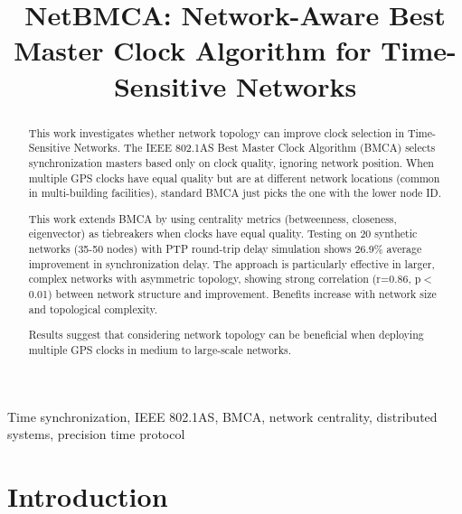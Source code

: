 \documentclass[conference]{IEEEtran}
\begin{document}
\title{NetBMCA: Network-Aware Best Master Clock Algorithm for Time-Sensitive Networks\\}

\author{
}


\maketitle

\begin{abstract}
This work investigates whether network topology can improve clock selection in Time-Sensitive Networks. The IEEE 802.1AS Best Master Clock Algorithm (BMCA) selects synchronization masters based only on clock quality, ignoring network position. When multiple GPS clocks have equal quality but are at different network locations (common in multi-building facilities), standard BMCA just picks the one with the lower node ID.

This work extends BMCA by using centrality metrics (betweenness, closeness, eigenvector) as tiebreakers when clocks have equal quality. Testing on 20 synthetic networks (35-50 nodes) with PTP round-trip delay simulation shows 26.9\% average improvement in synchronization delay. The approach is particularly effective in larger, complex networks with asymmetric topology, showing strong correlation (r=0.86, p$<$0.01) between network structure and improvement. Benefits increase with network size and topological complexity.

Results suggest that considering network topology can be beneficial when deploying multiple GPS clocks in medium to large-scale networks.
\end{abstract}

\begin{IEEEkeywords}
Time synchronization, IEEE 802.1AS, BMCA, network centrality, distributed systems, precision time protocol
\end{IEEEkeywords}

\section{Introduction}
\end{document}
